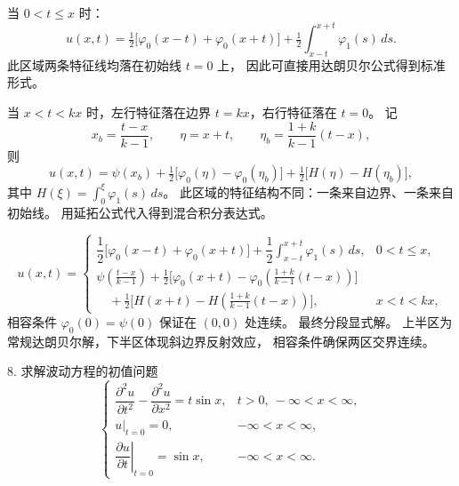 \begin{solution}
\begin{dxsolution}
当 $0<t\le x$ 时：
\[
u(x,t)
 =\tfrac12\big[\varphi_0(x-t)+\varphi_0(x+t)\big]
  +\tfrac12\int_{x-t}^{x+t}\varphi_1(s)\,ds.
\]
\tcblower
此区域两条特征线均落在初始线 $t=0$ 上，  
因此可直接用达朗贝尔公式得到标准形式。
\end{dxsolution}

\begin{dxsolution}
当 $x<t<kx$ 时，左行特征落在边界 $t=kx$，右行特征落在 $t=0$。  
记
\[
x_b=\frac{t-x}{k-1},\qquad 
\eta=x+t,\qquad 
\eta_b=\frac{1+k}{k-1}(t-x),
\]
则
\[
u(x,t)
 =\psi(x_b)
  +\tfrac12\big[\varphi_0(\eta)-\varphi_0(\eta_b)\big]
  +\tfrac12\big[H(\eta)-H(\eta_b)\big],
\]
其中 $H(\xi)=\int_0^{\xi}\varphi_1(s)\,ds$。
\tcblower
此区域的特征结构不同：一条来自边界、一条来自初始线。  
用延拓公式代入得到混合积分表达式。
\end{dxsolution}

\begin{dxsolution}
\[
u(x,t)=
\begin{cases}
\dfrac12\big[\varphi_0(x-t)+\varphi_0(x+t)\big]
+\dfrac12\displaystyle\int_{x-t}^{x+t}\varphi_1(s)\,ds,
& 0<t\le x,\\[12pt]
\psi\!\left(\tfrac{t-x}{k-1}\right)
+\tfrac12\Big[\varphi_0(x+t)
-\varphi_0\!\left(\tfrac{1+k}{k-1}(t-x)\right)\Big]\\[4pt]
\quad
+\tfrac12\Big[H(x+t)
-H\!\left(\tfrac{1+k}{k-1}(t-x)\right)\Big],
& x<t<kx,
\end{cases}
\]
相容条件 $\varphi_0(0)=\psi(0)$ 保证在 $(0,0)$ 处连续。
\tcblower
最终分段显式解。  
上半区为常规达朗贝尔解，下半区体现斜边界反射效应，  
相容条件确保两区交界连续。
\end{dxsolution}
\end{solution}
\begin{exercise}
8. 求解波动方程的初值问题
\[
\begin{cases}
\dfrac{\partial^2 u}{\partial t^2} - \dfrac{\partial^2 u}{\partial x^2} = t\sin x, & t>0,\ -\infty<x<\infty, \\[6pt]
u|_{t=0} = 0, & -\infty<x<\infty, \\[6pt]
\left.\dfrac{\partial u}{\partial t}\right|_{t=0} = \sin x, & -\infty<x<\infty.
\end{cases}
\]
\end{exercise}
